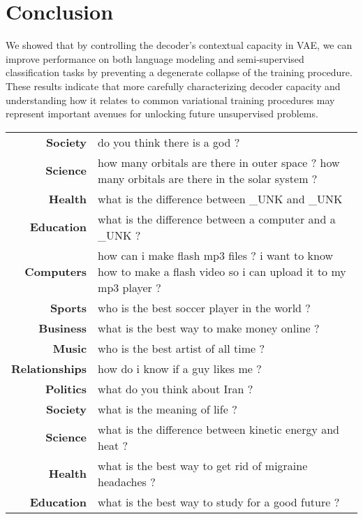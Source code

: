 \documentclass{article}
\begin{document}
\section{Conclusion}

We showed that by controlling the decoder's contextual capacity in VAE, we can improve performance on both language modeling and semi-supervised classification tasks by preventing a degenerate collapse of the training procedure. These results indicate that more carefully characterizing decoder capacity and understanding how it relates to common variational training procedures may represent important avenues for unlocking future unsupervised problems.






\appendix
\begin{table*}[!thbp]
  \centering
  \small
  \begin{tabular}{r  p{12cm}}
    \toprule
    {\bf Society} & do you think there is a god ? \\
    {\bf Science} & how many orbitals are there in outer space ? how many orbitals are there in the solar system ? \\
    {\bf Health} & what is the difference between \_UNK and \_UNK \\
    {\bf Education} & what is the difference between a computer and a \_UNK ? \\
    {\bf Computers} & how can i make flash mp3 files ? i want to know how to make a flash video so i can upload it to my mp3 player ? \\
    {\bf Sports} & who is the best soccer player in the world ? \\
    {\bf Business} & what is the best way to make money online ? \\
    {\bf Music} & who is the best artist of all time ? \\
    {\bf Relationships} & how do i know if a guy likes me ? \\
    {\bf Politics} & what do you think about Iran ? \\
    \midrule
    {\bf Society} & what is the meaning of life ? \\
    {\bf Science} & what is the difference between kinetic energy and heat ? \\
    {\bf Health} & what is the best way to get rid of migraine headaches ? \\
    {\bf Education} & what is the best way to study for a good future ? \\

\end{tabular}
\end{table*}
\end{document}
